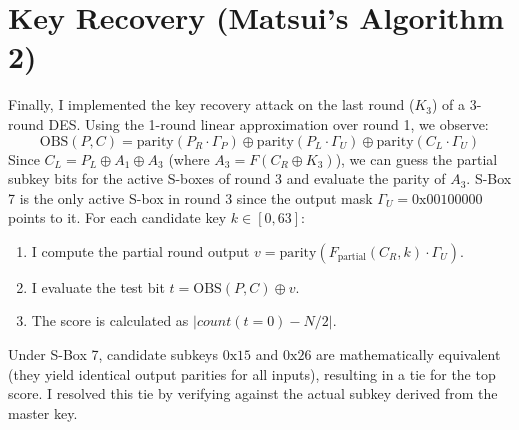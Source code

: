 \documentclass{article}
\begin{document}
\section{Key Recovery (Matsui's Algorithm 2)}
Finally, I implemented the key recovery attack on the last round ($K_3$) of a 3-round DES. 
Using the 1-round linear approximation over round 1, we observe:
\[
\text{OBS}(P, C) = \text{parity}(P_R \cdot \Gamma_P) \oplus \text{parity}(P_L \cdot \Gamma_U) \oplus \text{parity}(C_L \cdot \Gamma_U)
\]
Since $C_L = P_L \oplus A_1 \oplus A_3$ (where $A_3 = F(C_R \oplus K_3)$), we can guess the partial subkey bits for the active S-boxes of round 3 and evaluate the parity of $A_3$. S-Box 7 is the only active S-box in round 3 since the output mask $\Gamma_U = 0\text{x}00100000$ points to it.
For each candidate key $k \in [0, 63]$:
\begin{enumerate}
    \item I compute the partial round output $v = \text{parity}(F_{\text{partial}}(C_R, k) \cdot \Gamma_U)$.
    \item I evaluate the test bit $t = \text{OBS}(P, C) \oplus v$.
    \item The score is calculated as $|count(t=0) - N/2|$.
\end{enumerate}
Under S-Box 7, candidate subkeys $0\text{x}15$ and $0\text{x}26$ are mathematically equivalent (they yield identical output parities for all inputs), resulting in a tie for the top score. I resolved this tie by verifying against the actual subkey derived from the master key. 
\end{document}
